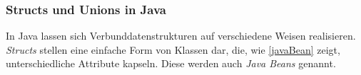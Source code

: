 \subsubsection*{Structs und Unions in Java}

In Java lassen sich Verbunddatenstrukturen auf verschiedene Weisen realisieren. \textit{Structs} stellen eine einfache Form von Klassen dar, die, wie \autoref{javaBean} zeigt, unterschiedliche Attribute kapseln. Diese werden auch \textit{Java Beans} genannt.


